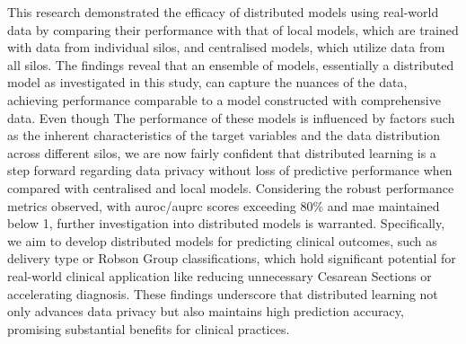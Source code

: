 
This research demonstrated the efficacy of distributed models using real-world data by comparing their performance with that of local models, which are trained with data from individual silos, and centralised models, which utilize data from all silos. The findings reveal that an ensemble of models, essentially a distributed model as investigated in this study, can capture the nuances of the data, achieving performance comparable to a model constructed with comprehensive data. Even though The performance of these models is influenced by factors such as the inherent characteristics of the target variables and the data distribution across different silos, we are now fairly confident that distributed learning is a step forward regarding data privacy without loss of predictive performance when compared with centralised and local models.
Considering the robust performance metrics observed, with \ac{auroc}/\ac{auprc} scores exceeding 80\% and \ac{mae} maintained below 1, further investigation into distributed models is warranted. Specifically, we aim to develop distributed models for predicting clinical outcomes, such as delivery type or Robson Group classifications, which hold significant potential for real-world clinical application like reducing unnecessary Cesarean Sections or accelerating diagnosis. These findings underscore that distributed learning not only advances data privacy but also maintains high prediction accuracy, promising substantial benefits for clinical practices.
